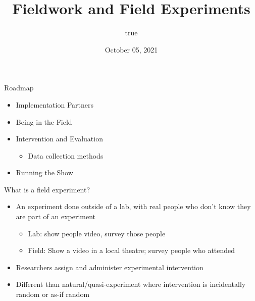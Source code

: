 \documentclass[
  ignorenonframetext,
]{beamer}
\title{Fieldwork and Field Experiments}
\author{true}
\date{October 05, 2021}
\providecommand{\tightlist}{%
  \setlength{\itemsep}{0pt}\setlength{\parskip}{0pt}}
\begin{document}
\frame{\titlepage}

\begin{frame}[allowframebreaks]
  \tableofcontents[hideallsubsections]
\end{frame}
\begin{frame}
\end{frame}

\begin{frame}{Roadmap}
\protect\hypertarget{roadmap}{}
\begin{itemize}
\tightlist
\item
  Implementation Partners
\item
  Being in the Field
\item
  Intervention and Evaluation

  \begin{itemize}
  \tightlist
  \item
    Data collection methods
  \end{itemize}
\item
  Running the Show
\end{itemize}
\end{frame}

\begin{frame}{What is a field experiment?}
\protect\hypertarget{what-is-a-field-experiment}{}
\begin{itemize}
\tightlist
\item
  An experiment done outside of a lab, with real people who don't know
  they are part of an experiment

  \begin{itemize}
  \tightlist
  \item
    Lab: show people video, survey those people
  \item
    Field: Show a video in a local theatre; survey people who attended
  \end{itemize}
\item
  Researchers assign and administer experimental intervention
\end{itemize}

\smallskip

\begin{itemize}
\tightlist
\item
  Different than natural/quasi-experiment where intervention is
  incidentally random or as-if random
\end{itemize}
\end{frame}
\end{document}
